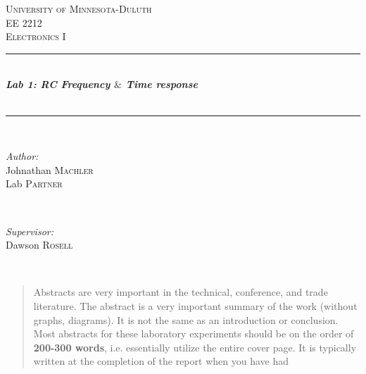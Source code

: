 \documentclass[10pt,a4paper,draft]{article}
\begin{document}
\begin{titlepage}
\newcommand{\HRule}{\rule{\linewidth}{0.5mm}} %
\center %
\textsc{\LARGE University of Minnesota-Duluth}\\[1.5cm] %
\textsc{\Large EE 2212}\\[0.5cm] %
\textsc{\large Electronics I}\\[0.5cm] %
\HRule \\[0.4cm]
{ \huge \bfseries \emph{{\color{black}Lab 1: RC Frequency $\&$ Time response }}}\\[0.4cm] %
{\color{black}{\large \today}}\\
\HRule \\[1cm]


\begin{minipage}{0.4\textwidth}
\begin{flushleft} \large
\emph{Author:}\\
Johnathan \textsc{Machler}\\
Lab  \textsc{Partner}
\end{flushleft}
\end{minipage}
~
\begin{minipage}{0.4\textwidth}
\begin{flushright} \large
\emph{Supervisor:} \\
Dawson \textsc{Rosell} %
\end{flushright}


\end{minipage}\\[1cm] %

\begin{abstract}
Abstracts are very important in the technical, conference,   and trade literature.
The abstract is a very important summary of the work (without graphs, diagrams).
It is not the same as an introduction or conclusion.
Most abstracts for these laboratory experiments should be on the order of \textbf{200-300 words}, i.e. essentially utilize the entire cover page. It is  typically written at the completion of the report when you have had 
\end{abstract}
\vfill %
\end{titlepage}
\end{document}
